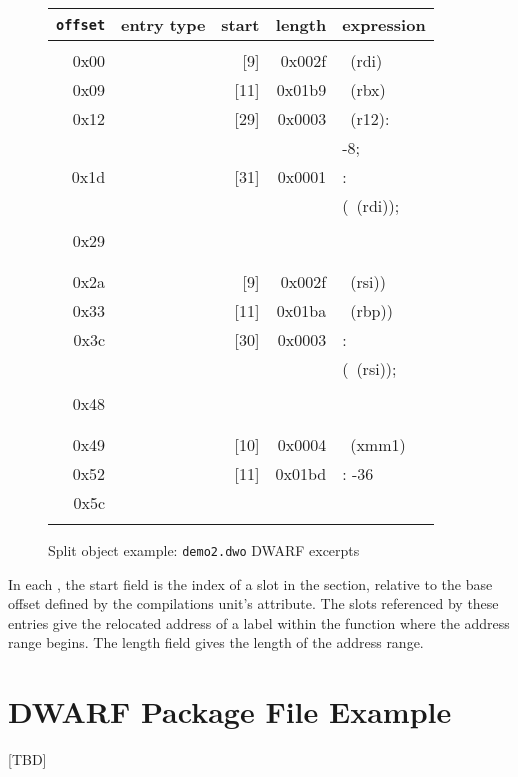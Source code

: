\begin{figure}
\begin{dwflisting}
\begin{tabular}{rlrrl}
\texttt{offset} & entry type & start & length & expression \\
\hline \\
0x00 & \DWLLEstartlengthentry &  [9] & 0x002f & \DWOPregfive~(rdi) \\
0x09 & \DWLLEstartlengthentry & [11] & 0x01b9 & \DWOPregthree~(rbx) \\
0x12 & \DWLLEstartlengthentry & [29] & 0x0003 & \DWOPbregtwelve~(r12):\\
&&&& -8; \DWOPstackvalue \\
0x1d & \DWLLEstartlengthentry & [31] & 0x0001 & \DWOPentryvalue: \\
&&&& (\DWOPregfive~(rdi)); \\
&&&& \DWOPstackvalue \\
0x29 & \DWLLEendoflistentry &&& \\
\\   & \hhline{-} &&& \\
0x2a & \DWLLEstartlengthentry &  [9] & 0x002f & \DWOPregfour~(rsi)) \\
0x33 & \DWLLEstartlengthentry & [11] & 0x01ba & \DWOPregsix~(rbp)) \\
0x3c & \DWLLEstartlengthentry & [30] & 0x0003 & \DWOPentryvalue: \\
&&&& (\DWOPregfour~(rsi)); \\
&&&& \DWOPstackvalue \\
0x48 & \DWLLEendoflistentry &&& \\
\\   & \hhline{-} &&& \\
0x49 & \DWLLEstartlengthentry & [10] & 0x0004 & \DWOPregeighteen~(xmm1) \\
0x52 & \DWLLEstartlengthentry & [11] & 0x01bd & \DWOPfbreg: -36 \\
0x5c & \DWLLEendoflistentry &&& \\
&&&& \\
\end{tabular}
\end{dwflisting}
\caption{Split object example: \texttt{demo2.dwo} DWARF \dotdebuglocdwo{} excerpts}
\label{fig:splitobjectexampledemo2dwodwarfdebuglocdwoexcerpts}
\end{figure}

In each \DWLLEstartlengthentry{}, the start field is the index
of a slot in the \dotdebugaddr{} section, relative to the base
offset defined by the compilations unit's \DWATaddrbase{}
attribute. The \dotdebugaddr{} slots referenced by these entries give
the relocated address of a label within the function where the
address range begins. The length field gives the length of the
address range.

\clearpage
\section{DWARF Package File Example}
\label{app:dwarfpackagefileexample}
[TBD]
